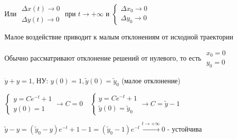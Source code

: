 \documentclass[12pt]{article}
\begin{document}
    Или $\begin{matrix}\Delta x (t) \to 0 \\ \Delta y (t) \to 0\end{matrix}$ при $t \to +\infty$ и $\begin{cases}\Delta x_0 \to 0 \\ \Delta y_0 \to 0\end{cases}$

    \Nota Малое воздействие приводит к малым отклонениям от исходной траектории

    \Nota Обычно рассматривают отклонение решений от нулевого, то есть $\begin{matrix}x_0 = 0 \\ y_0 = 0\end{matrix}$

    \Ex $\dot y + y = 1$, НУ: $y(0) = 1, \tilde{y}(0) = \tilde{y}_0$ (малое отклонение)

    $\begin{cases}y = Ce^{-t} + 1 \\ y(0) = 1\end{cases} \rightarrow C = 0 \quad
    \begin{cases}y = Ce^{-t} + 1 \\ \tilde{y}(0) = \tilde{y}_0\end{cases} \to C = \tilde{y} - 1$

    $\tilde{y} - y = (\tilde{y}_0 - y) e^{-t} + 1 - 1 = (\tilde{y}_0 - 1)e^{-t} \stackrel{t \to +\infty}{\longrightarrow} 0$ - устойчива{\huge 🥳}
\end{document}
